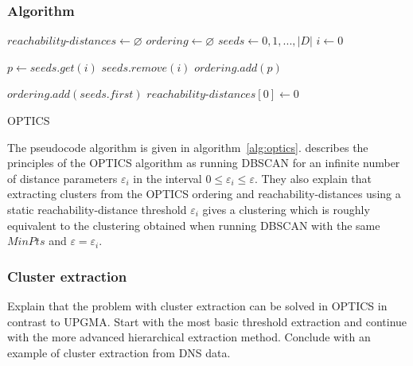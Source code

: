 \documentclass[a4paper]{report}
\begin{document}
\subsubsection{Algorithm}
%
{
    \fontsize{10}{12}
    \selectfont
    \begin{algorithm}[t]
        \DontPrintSemicolon
        \BlankLine
        \BlankLine

        $reachability$-$distances \gets \varnothing$\;
        $ordering \gets \varnothing$\;
        $seeds \gets 0,1,...,|D|$\;
        $i \gets 0$\;

         {
            $p \gets seeds.get(i)$\;
            $seeds.remove(i)$\;
            $ordering.add(p)$\;

        } 
        \;
        $ordering.add(seeds.first)$\;
        $reachability$-$distances[0] \gets 0$\;
        \BlankLine
        \caption{OPTICS}
        \label{alg:optics}
    \end{algorithm}
}

The pseudocode algorithm is given in algorithm~\ref{alg:optics}.
\citeauthor{ankerst99} describes the principles of the OPTICS algorithm as
running DBSCAN for an infinite number of distance parameters $\varepsilon_i$
in the interval $0 \le \varepsilon_i \le \varepsilon$. They also explain that
extracting clusters from the OPTICS ordering and reachability-distances using
a static reachability-distance threshold $\varepsilon_i$ gives a clustering
which is roughly equivalent to the clustering obtained when running DBSCAN
with the same $MinPts$ and $\varepsilon = \varepsilon_i$.

\subsubsection{Cluster extraction}
Explain that the problem with cluster extraction can be solved in OPTICS in
contrast to UPGMA. Start with the most basic threshold extraction and continue
with the more advanced hierarchical extraction method. Conclude with an example
of cluster extraction from DNS data.
\end{document}
